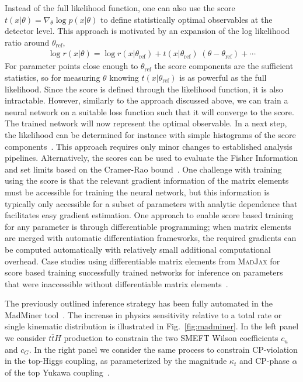 \documentclass[submission,Phys]{SciPost}
\begin{document}
Instead of the full likelihood function, one can also use the score $t(x|\theta) = \nabla_\theta \log p(x|\theta)$ to define statistically optimal observables at the detector level. This approach is motivated by an expansion of the log likelihood ratio around $\theta_\text{ref}$,
%
\begin{align}
  \log r(x|\theta) = \log r(x|\theta_\text{ref}) + t(x|\theta_\text{ref}) \; (\theta - \theta_\text{ref}) + \cdots 
\end{align}
%
For parameter points close enough to $\theta_\text{ref}$ the score components are the sufficient statistics, so for measuring $\theta$ knowing $t(x|\theta_\text{ref})$ is as powerful as the full likelihood. Since the score is defined through the likelihood function, it is also intractable. However, similarly to the approach discussed above, we can train a neural network on a suitable loss function such that it will converge to the score. The trained network will now represent the optimal observable. In a next step, the likelihood can be determined for instance with simple histograms of the score components~\cite{Brehmer:2019xox, Brehmer:2020zwh}. This approach requires only minor changes to established analysis pipelines. Alternatively, the scores can be used to evaluate the Fisher Information and set limits based on the Cramer-Rao bound~\cite{Brehmer:2019xox}. One challenge with training using the score is that the relevant gradient information of the matrix elements must be accessible for training the neural network, but this information is typically only accessible for a subset of parameters with analytic dependence that facilitates easy gradient estimation. One approach to enable score based training for any parameter is through differentiable programming; when matrix elements are merged with automatic differentiation frameworks, the required gradients can be computed automatically with relatively small additional computational overhead. Case studies using differentiable matrix elements from \textsc{MadJax} for score based training successfully trained networks for inference on parameters that were inaccessible without differentiable matrix elements~\cite{HeinrichKagan:2022}.

The previously outlined inference strategy has been fully automated in the MadMiner tool~\cite{Brehmer:2019xox,MadMiner_code}. The increase in physics sensitivity relative to a total rate or single kinematic distribution is illustrated in Fig.~\ref{fig:madminer}. In the left panel we consider $t\bar{t}H$ production to constrain the two SMEFT Wilson coefficients $c_u$ and $c_G$. In the right panel we consider the same process to constrain CP-violation in the top-Higgs coupling, as parameterized by the magnitude $\kappa_t$ and CP-phase $\alpha$ of the top Yukawa coupling~\cite{Bahl:2021dnc, Barman:2021yfh}.
\end{document}
